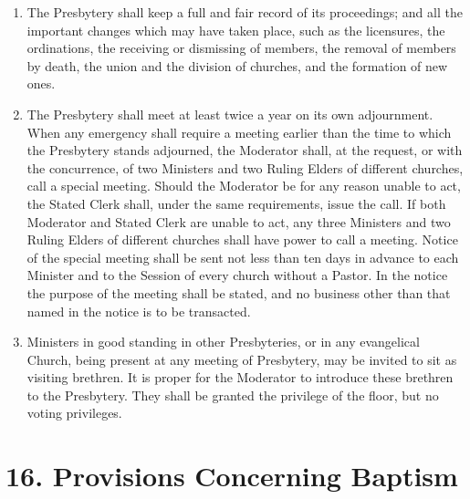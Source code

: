 \documentclass[
]{book}
\begin{document}
\begin{enumerate}
\item
  \protect\hypertarget{15.9}{\href{}{}}The Presbytery shall keep a full and fair record of its proceedings; and all the important changes which may have taken place, such as the licensures, the ordinations, the receiving or dismissing of members, the removal of members by death, the union and the division of churches, and the formation of new ones.
\item
  The Presbytery shall meet at least twice a year on its own adjournment. When any emergency shall require a meeting earlier than the time to which the Presbytery stands adjourned, the Moderator shall, at the request, or with the concurrence, of two Ministers and two Ruling Elders of different churches, call a special meeting. Should the Moderator be for any reason unable to act, the Stated Clerk shall, under the same requirements, issue the call. If both Moderator and Stated Clerk are unable to act, any three Ministers and two Ruling Elders of different churches shall have power to call a meeting. Notice of the special meeting shall be sent not less than ten days in advance to each Minister and to the Session of every church without a Pastor. In the notice the purpose of the meeting shall be stated, and no business other than that named in the notice is to be transacted.
\item
  Ministers in good standing in other Presbyteries, or in any evangelical Church, being present at any meeting of Presbytery, may be invited to sit as visiting brethren. It is proper for the Moderator to introduce these brethren to the Presbytery. They shall be granted the privilege of the floor, but no voting privileges.
\end{enumerate}

\hypertarget{provisions-concerning-baptism}{%
\section*{16. Provisions Concerning Baptism}\label{provisions-concerning-baptism}}

\protect\hypertarget{chapter-slug-16-provisions-concerning-baptism}{\href{}{}}
\end{document}
